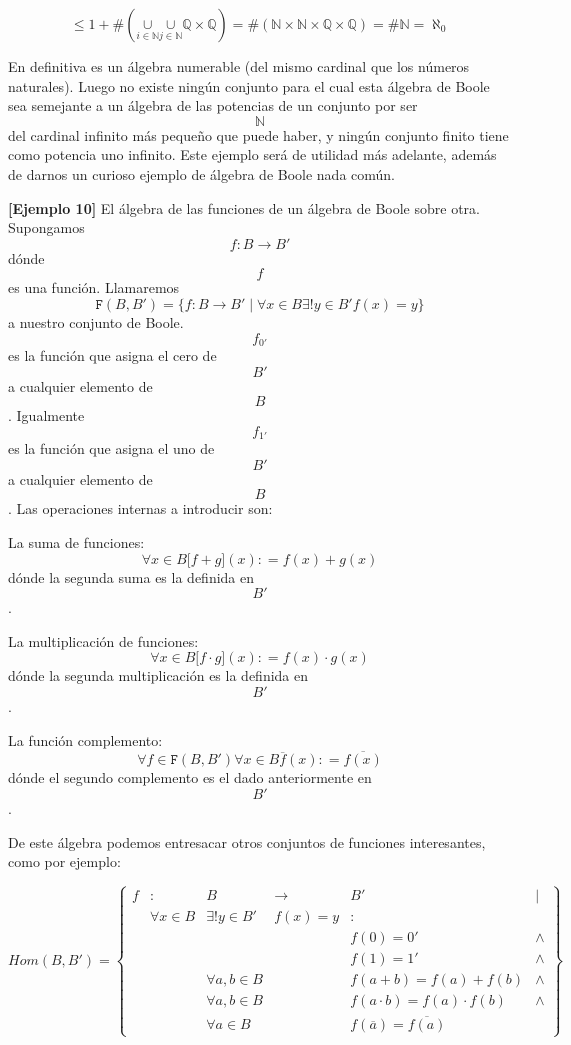 \documentclass[
]{article}
\begin{document}
\begin{enumerate}
  \[{{\leq {1 + {\#\left( {\underset{i \in \mathbb{N}}{\mathbf{\mathrm{\cup}}}\underset{j \in \mathbb{N}}{\mathbf{\mathrm{\cup}}}{\mathbb{Q} \times \mathbb{Q}}} \right)}}} = \#}{\left( {{{\mathbb{N} \times \mathbb{N}} \times \mathbb{Q}} \times \mathbb{Q}} \right) = \#}{\mathbb{N} = \aleph_{0}}\]

  En definitiva es un álgebra numerable (del mismo cardinal que los
  números naturales). Luego no existe ningún conjunto para el cual esta
  álgebra de Boole sea semejante a un álgebra de las potencias de un
  conjunto por ser \[\mathbb{N}\]del cardinal infinito más pequeño que
  puede haber, y ningún conjunto finito tiene como potencia uno
  infinito. Este ejemplo será de utilidad más adelante, además de darnos
  un curioso ejemplo de álgebra de Boole nada común.

  \textbf{{[}Ejemplo 10{]}} El álgebra de las funciones de un álgebra de
  Boole sobre otra. Supongamos \[f:{B\rightarrow B}'\]dónde \[f\] es una
  función. Llamaremos
  \[{\mathtt{F}{({B,B'})}} = {\{{f:{B\rightarrow B}' \mid \forall{x \in B}\exists!{y \in B}'f{{(x)} = y}}\}}\]
  a nuestro conjunto de Boole. \[f_{0'}\] es la función que asigna el
  cero de \[B'\] a cualquier elemento de \[B\]. Igualmente \[f_{1'}\] es
  la función que asigna el uno de \[B'\] a cualquier elemento de \[B\].
  Las operaciones internas a introducir son:

  La suma de funciones:
  \[\forall{x \in B}{\lbrack{f + g}\rbrack}{(x)}{: = f}{{(x)} + g}{(x)}\]dónde
  la segunda suma es la definida en \[B'\].

  La multiplicación de funciones:
  \[\forall{x \in B}{\lbrack{f \cdot g}\rbrack}{(x)}{: = f}{{(x)} \cdot g}{(x)}\]
  dónde la segunda multiplicación es la definida en \[B'\].

  La función complemento:
  \[\forall{f \in \mathtt{F}}{({B,B'})}\forall{x \in B}\overline{f}{(x)}{: = \overline{f{(x)}}}\]dónde
  el segundo complemento es el dado anteriormente en \[B'\].

  De este álgebra podemos entresacar otros conjuntos de funciones
  interesantes, como por ejemplo:

  \[{\mathtt{\mathit{Hom}}{({B,B'})}} = \begin{Bmatrix}
  f & : & B & \rightarrow & {B'} & \mathbf{\mid} \\
   & {\forall{x \in B}} & {\exists!{y \in B}'} & {f{{(x)} = y}} & \mathbf{\mathrm{:}} & \\
   & & & & {f{{(0)} = 0}'} & \land \\
   & & & & {f{{(1)} = 1}'} & \land \\
   & & {\forall a,{b \in B}} & & {f{{({a + b})} = f}{{(a)} + f}{(b)}} & \land \\
   & & {\forall a,{b \in B}} & & {f{{({a \cdot b})} = f}{{(a)} \cdot f}{(b)}} & \land \\
   & & {\forall{a \in B}} & & {f{{(\overline{a})} = \overline{f{(a)}}}} & 
  \end{Bmatrix}\]


\end{enumerate}
\end{document}
